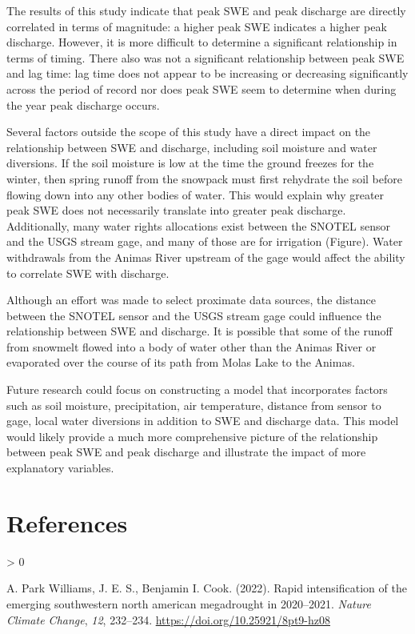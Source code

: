 \documentclass[
  12pt,
]{article}
\newlength{\cslhangindent}
\newenvironment{CSLReferences}[2] %
 {%
  \setlength{\parindent}{0pt}
  \ifodd #1 \everypar{\setlength{\hangindent}{\cslhangindent}}\ignorespaces\fi
  \ifnum #2 > 0
  \setlength{\parskip}{#2\baselineskip}
  \fi
 }%
 {}
\begin{document}
The results of this study indicate that peak SWE and peak discharge are
directly correlated in terms of magnitude: a higher peak SWE indicates a
higher peak discharge. However, it is more difficult to determine a
significant relationship in terms of timing. There also was not a
significant relationship between peak SWE and lag time: lag time does
not appear to be increasing or decreasing significantly across the
period of record nor does peak SWE seem to determine when during the
year peak discharge occurs.

Several factors outside the scope of this study have a direct impact on
the relationship between SWE and discharge, including soil moisture and
water diversions. If the soil moisture is low at the time the ground
freezes for the winter, then spring runoff from the snowpack must first
rehydrate the soil before flowing down into any other bodies of water.
This would explain why greater peak SWE does not necessarily translate
into greater peak discharge. Additionally, many water rights allocations
exist between the SNOTEL sensor and the USGS stream gage, and many of
those are for irrigation (Figure). Water withdrawals from the Animas
River upstream of the gage would affect the ability to correlate SWE
with discharge.

Although an effort was made to select proximate data sources, the
distance between the SNOTEL sensor and the USGS stream gage could
influence the relationship between SWE and discharge. It is possible
that some of the runoff from snowmelt flowed into a body of water other
than the Animas River or evaporated over the course of its path from
Molas Lake to the Animas.

Future research could focus on constructing a model that incorporates
factors such as soil moisture, precipitation, air temperature, distance
from sensor to gage, local water diversions in addition to SWE and
discharge data. This model would likely provide a much more
comprehensive picture of the relationship between peak SWE and peak
discharge and illustrate the impact of more explanatory variables.

\newpage

\hypertarget{references}{%
\section*{References}\label{references}}

\hypertarget{refs}{}
\begin{CSLReferences}{1}{0}
\leavevmode\hypertarget{ref-WILLIAMS2022232}{}%
A. Park Williams, J. E. S., Benjamin I. Cook. (2022). Rapid
intensification of the emerging southwestern north american megadrought
in 2020--2021. \emph{Nature Climate Change}, \emph{12}, 232--234.
\url{https://doi.org/10.25921/8pt9-hz08}

\end{CSLReferences}
\end{document}
